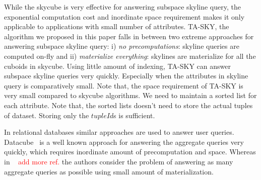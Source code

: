 \vspace{1mm}
 While the skycube is very effective for answering subspace skyline query, the exponential computation cost and inordinate space requirement makes it only applicable to applications with small number of attributes. TA-SKY, the algorithm we proposed in this paper falls in between two extreme approaches for answering subspace skyline query: i) \textit{no precomputations}: skyline queries are computed on-fly and ii) \textit{materialize everything}: skylines are materialize for all the cuboids in skycube. Using little amount of indexing, TA-SKY can answer subspace skyline queries very quickly. Especially when the attributes in skyline query is comparatively small. Note that, the space requirement of TA-SKY is very small compared to skycube algorithms. We need to maintain a sorted list for each attribute. Note that, the sorted lists doesn't need to store the actual tuples of dataset. Storing only the $tupleId$s is sufficient.

In relational databases similar approaches are used to answer user queries. Datacube~\cite{gray1997data} is a well known approach for answering the aggregate queries very quickly, which requires inordinate amount of precomputation and space. Whereas in ~\cite{das2006answering} \textcolor{red}{add more ref.} the authors consider the problem of answering as many aggregate queries as possible using small amount of materialization.




